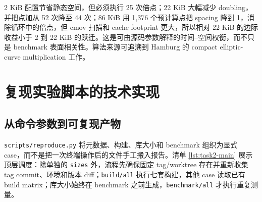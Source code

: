 \documentclass[11pt,a4paper,fontset=none]{ctexart}
\begin{document}
2 KiB 配置节省静态空间，但必须执行 25 次倍点；22 KiB 大幅减少 doubling，并把点加从 52 次降至 44 次；86 KiB 用 1,376 个预计算点把 spacing 降到 1，消除循环中的倍点，但 cmov 扫描和 cache footprint 更大，所以相对 22 KiB 的边际收益小于 2 到 22 KiB 的跃迁。这是可由源码参数解释的时间--空间权衡，而不只是 benchmark 表面相关性。算法来源可追溯到 Hamburg 的 compact elliptic-curve multiplication 工作\cite{hamburg}。

\section{复现实验脚本的技术实现}

\subsection{从命令参数到可复现产物}

\texttt{scripts/reproduce.py} 将元数据、构建、库大小和 benchmark 组织为显式 case，而不是把一次终端操作后的文件手工搬入报告。清单 \ref{lst:task2-main} 展示顶层调度：除单独的 \texttt{sizes} 外，流程先确保固定 tag/worktree 存在并重新收集 tag commit、环境和版本 diff；\texttt{build/all} 执行七套构建，其他 case 读取已有 build matrix；库大小始终在 benchmark 之前生成，\texttt{benchmark/all} 才执行重复测量。
\end{document}
